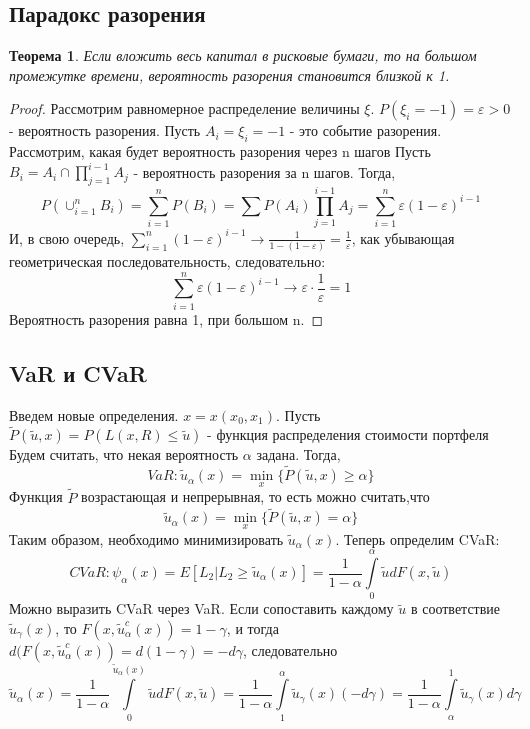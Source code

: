\documentclass[14pt,a4paper]{article}
\theoremstyle{plain}
\newtheorem{Th}{Теорема}[section]
\theoremstyle{definition}
\begin{document}
 \subsection{Парадокс разорения}


\begin{Th} \label{main}
Если вложить весь капитал в рисковые бумаги, то на большом промежутке времени, вероятность разорения становится близкой к 1.
\end{Th}
\begin{proof}
Рассмотрим равномерное распределение величины $\xi$.
$P(\xi_i = -1) = \varepsilon >0$ - вероятность разорения.
Пусть $A_i = \xi_i = -1$ - это событие разорения.
Рассмотрим, какая будет вероятность разорения через n шагов
Пусть $B_i=A_i\cap \prod\limits_{j=1}^{i-1}A_j$ - вероятность разорения за n шагов.
Тогда,
$$
P(\cup_{i=1}^n B_i) = \sum\limits_{i=1}^n P(B_i) = \sum P(A_i) \prod\limits_{j=1}^{i-1}A_j = \sum\limits_{i=1}^n \varepsilon (1-\varepsilon)^{i-1}
$$
И, в свою очередь, $\sum\limits_{i=1}^n (1-\varepsilon)^{i-1} \longrightarrow \frac{1}{1-(1-\varepsilon)} = \frac{1}{\varepsilon}$, как убывающая геометрическая последовательность, следовательно:
$$
\sum\limits_{i=1}^n \varepsilon (1-\varepsilon)^{i-1}  \longrightarrow \varepsilon \cdot \frac{1}{\varepsilon} = 1
$$
Вероятность разорения равна 1, при большом n.
\end{proof}

 \subsection{VaR и CVaR}

Введем новые определения.
$x = x(x_0,x_1)$.
Пусть $\tilde{P}(\tilde{u},x) = P(L(x,R) \le \tilde{u})$ - функция распределения стоимости портфеля
Будем считать, что некая вероятность $\alpha$ задана.
Тогда,
\vspace{2mm}
$$
VaR: \tilde{u}_\alpha (x) = \min\limits_{x} \{\tilde{P}(\tilde{u},x)\ge \alpha\}
$$
Функция $\tilde{P}$ возрастающая и непрерывная, то есть можно считать,что
$$
\tilde{u}_\alpha(x) = \min\limits_{x} \{\tilde{P}(\tilde{u},x) = \alpha\}
$$
Таким образом, необходимо минимизировать $\tilde{u}_\alpha (x)$.
Теперь определим CVaR:
$$
CVaR: \psi_\alpha (x) = E[L_2 | L_2 \ge \tilde{u}_\alpha (x)] = \frac{1}{1-\alpha} \int\limits_{0}^{\alpha} \tilde{u} dF(x,\tilde{u})
$$
Можно выразить CVaR через VaR. Если сопоставить каждому $\tilde{u}$ в соответствие $\tilde{u}_\gamma (x)$, то $F(x,\tilde{u}_\alpha^c (x)) = 1-\gamma$, и тогда $d(F(x,\tilde{u}_\alpha^c (x)) = d(1-\gamma) =  -d\gamma$, следовательно
$$
\tilde{u}_\alpha (x) = \frac{1}{1-\alpha} \int\limits_{0}^{\tilde{u}_\alpha (x)} \tilde{u} dF(x,\tilde{u}) = \frac{1}{1-\alpha} \int\limits_{1}^{\alpha} \tilde{u}_\gamma (x) (-d\gamma) = \frac{1}{1-\alpha} \int \limits_{\alpha}^{1} \tilde{u}_\gamma (x) d\gamma
$$
\end{document}
